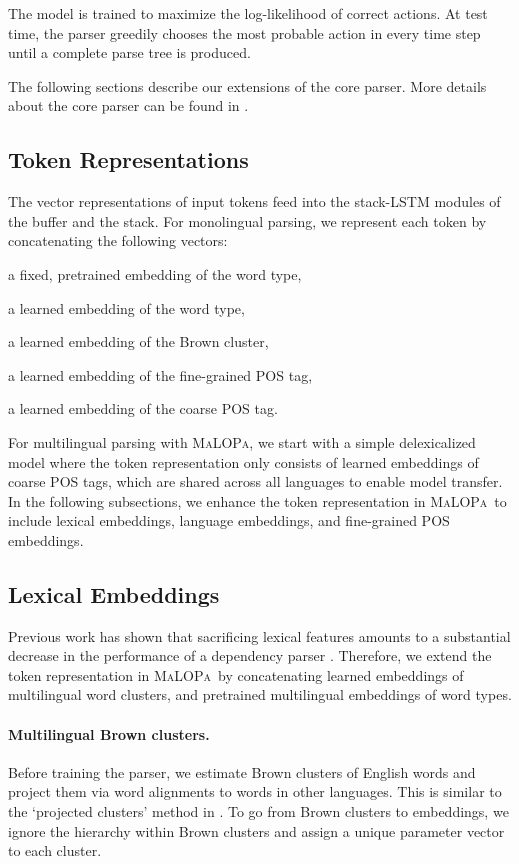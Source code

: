 \documentclass[11pt]{article}
\newcommand{\malopa}{\textsc{MaLOPa}}
\newenvironment{itemizesquish}{\begin{list}{\labelitemi}{\setlength{\itemsep}{0em}\setlength{\labelwidth}{0.5em}\setlength{\leftmargin}{\labelwidth}\addtolength{\leftmargin}{\labelsep}}}{\end{list}}
\begin{document}
The model is trained to maximize the log-likelihood of correct actions.
At test time, the parser greedily chooses the most probable action in every time step until a complete parse tree is produced.

The following sections describe our extensions of the core parser.
More details about the core parser can be found in .

\subsection{Token Representations}
The vector representations of input tokens feed into the stack-LSTM modules of the buffer and the stack.
For monolingual parsing, we represent each token by concatenating the following vectors:
\begin{itemizesquish}
\item a fixed, pretrained embedding of the word type,
\item a learned embedding of the word type, 
\item a learned embedding of the Brown cluster,
\item a learned embedding of the fine-grained POS tag,
\item a learned embedding of the coarse POS tag.
\end{itemizesquish}

For multilingual parsing with \malopa, we start with a simple delexicalized model where the token representation only consists of learned embeddings of coarse POS tags, which are shared across all languages to enable model transfer.
In the following subsections, we enhance the token representation in \malopa~to include lexical embeddings, language embeddings, and fine-grained POS embeddings.

\subsection{Lexical Embeddings}
\label{sec:embeddings}

Previous work has shown that sacrificing lexical features amounts to a substantial decrease in the performance of a dependency parser \cite{cohen:11,tackstrom:12,tiedemann:15,guo:15}.  
Therefore, we extend the token representation in \malopa~by concatenating learned embeddings of multilingual word clusters, and pretrained multilingual embeddings of word types.

\paragraph{Multilingual Brown clusters.} Before training the parser, we estimate Brown clusters of English words and project them via word alignments to words in other languages. This is similar to the `projected clusters' method in .
To go from Brown clusters to embeddings, we ignore the hierarchy within Brown clusters and assign a unique parameter vector to each cluster.
\end{document}
